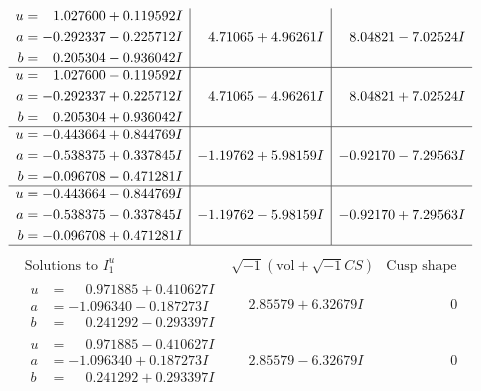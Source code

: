 \documentclass[1p]{elsarticle_modified}
\theoremstyle{definition}
\newcommand{\I}{\sqrt{-1}}
\begin{document}
$$\begin{array}{c|c|c}
\begin{aligned}
u &= \phantom{-}1.027600 + 0.119592 I \\
a &= -0.292337 - 0.225712 I \\
b &= \phantom{-}0.205304 - 0.936042 I\end{aligned}
 & \phantom{-}4.71065 + 4.96261 I & \phantom{-}8.04821 - 7.02524 I \\ \hline\begin{aligned}
u &= \phantom{-}1.027600 - 0.119592 I \\
a &= -0.292337 + 0.225712 I \\
b &= \phantom{-}0.205304 + 0.936042 I\end{aligned}
 & \phantom{-}4.71065 - 4.96261 I & \phantom{-}8.04821 + 7.02524 I \\ \hline\begin{aligned}
u &= -0.443664 + 0.844769 I \\
a &= -0.538375 + 0.337845 I \\
b &= -0.096708 - 0.471281 I\end{aligned}
 & -1.19762 + 5.98159 I & -0.92170 - 7.29563 I \\ \hline\begin{aligned}
u &= -0.443664 - 0.844769 I \\
a &= -0.538375 - 0.337845 I \\
b &= -0.096708 + 0.471281 I\end{aligned}
 & -1.19762 - 5.98159 I & -0.92170 + 7.29563 I\\
 \hline 
 \end{array}$$\newpage$$\begin{array}{c|c|c}  
\text{Solutions to }I^u_{1}& \I (\text{vol} + \sqrt{-1}CS) & \text{Cusp shape}\\
 \hline 
\begin{aligned}
u &= \phantom{-}0.971885 + 0.410627 I \\
a &= -1.096340 - 0.187273 I \\
b &= \phantom{-}0.241292 - 0.293397 I\end{aligned}
 & \phantom{-}2.85579 + 6.32679 I & \phantom{-0.000000 } 0 \\ \hline\begin{aligned}
u &= \phantom{-}0.971885 - 0.410627 I \\
a &= -1.096340 + 0.187273 I \\
b &= \phantom{-}0.241292 + 0.293397 I\end{aligned}
 & \phantom{-}2.85579 - 6.32679 I & \phantom{-0.000000 } 0 \\ \hline\begin{aligned}

\end{aligned}
\end{array}$$
\end{document}
